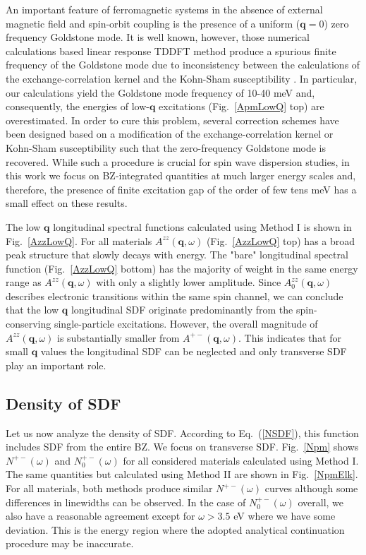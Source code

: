 An important feature of ferromagnetic systems in the absence of external magnetic field and spin-orbit coupling is the presence of a uniform ($\mathbf{q}=0$) zero frequency Goldstone mode. It is well known, however, those numerical calculations based linear response TDDFT method produce a spurious finite frequency of the Goldstone mode due to inconsistency between the calculations of the exchange-correlation kernel and the Kohn-Sham susceptibility \citep{Buczek,Bergara,Lounis3}. In particular, our calculations yield the Goldstone mode frequency of 10-40 meV and, consequently, the energies of low-$\mathbf{q}$ excitations (Fig.~\ref{ApmLowQ} top) are overestimated. In order to cure this problem, several correction schemes have been designed based on a modification of the exchange-correlation kernel\citep{Buczek,Lounis3} or Kohn-Sham susceptibility\citep{Bergara} such that the zero-frequency Goldstone mode is recovered. While such a procedure is crucial for spin wave dispersion studies, in this work we focus on BZ-integrated quantities at much larger energy scales and, therefore, the presence of finite excitation gap of the order of few tens meV has a small effect on these results.

The low $\mathbf{q}$ longitudinal spectral functions calculated using Method I is shown in Fig.~\ref{AzzLowQ}. For all materials $A^{zz}(\mathbf{q},\omega)$ (Fig.~\ref{AzzLowQ} top) has a broad peak structure that slowly decays with energy. The "bare" longitudinal spectral function (Fig.~\ref{AzzLowQ} bottom) has the majority of weight in the same energy range as $A^{zz}(\mathbf{q},\omega)$ with only a slightly lower amplitude. Since $A_0^{zz}(\mathbf{q},\omega)$ describes electronic transitions within the same spin channel, we can conclude that the low $\mathbf{q}$ longitudinal SDF originate predominantly from the spin-conserving single-particle excitations. However, the overall magnitude of $A^{zz}(\mathbf{q},\omega)$ is substantially smaller from $A^{+-}(\mathbf{q},\omega)$. This indicates that for small $\mathbf{q}$ values the longitudinal SDF can be neglected and only transverse SDF play an important role. 
\FloatBarrier


\subsection{Density of SDF}

Let us now analyze the density of SDF. According to Eq.~(\ref{NSDF}), this function includes SDF from the entire BZ. We focus on transverse SDF. Fig.~\ref{Npm} shows $N^{+-}(\omega)$ and $N^{+-}_0(\omega)$ for all considered materials calculated using Method I. The same quantities but calculated using Method II are shown in Fig.~\ref{NpmElk}. For all materials, both methods produce similar $N^{+-}(\omega)$ curves although some differences in linewidths can be observed. In the case of $N^{+-}_0(\omega)$ overall, we also have a reasonable agreement except for $\omega > 3.5$ eV where we have some deviation. This is the energy region where the adopted analytical continuation procedure may be inaccurate.

